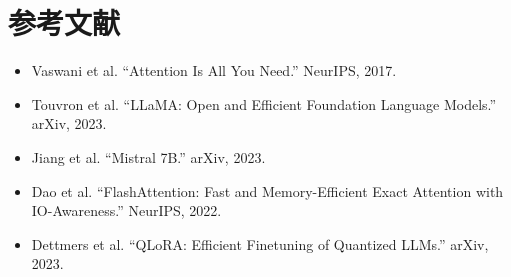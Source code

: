 \documentclass[UTF8,zihao=-4]{ctexart}
\begin{document}
\section*{参考文献}
\begin{itemize}
  \item Vaswani et al. ``Attention Is All You Need.'' NeurIPS, 2017.
  \item Touvron et al. ``LLaMA: Open and Efficient Foundation Language Models.'' arXiv, 2023.
  \item Jiang et al. ``Mistral 7B.'' arXiv, 2023.
  \item Dao et al. ``FlashAttention: Fast and Memory-Efficient Exact Attention with IO-Awareness.'' NeurIPS, 2022.
  \item Dettmers et al. ``QLoRA: Efficient Finetuning of Quantized LLMs.'' arXiv, 2023.
\end{itemize}
\end{document}
